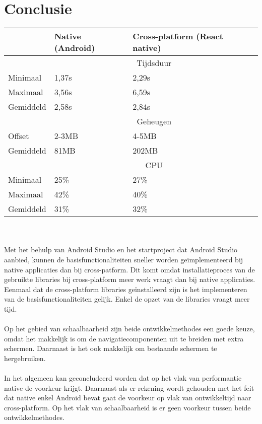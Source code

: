 \section{Conclusie}
\begin{tabular}{ |p{3cm}||p{6cm}|p{6cm}| }
    \hline
     & Native (Android) & Cross-platform (React native) \\
    \hline
     & \multicolumn{2}{|c|}{Tijdsduur} \\
    \hline
    Minimaal & 1,37s & 2,29s \\
    Maximaal & 3,56s & 6,59s \\
    Gemiddeld & 2,58s & 2,84s \\
    \hline
     & \multicolumn{2}{|c|}{Geheugen} \\ 
    \hline
    Offset & 2-3MB & 4-5MB \\
    Gemiddeld & 81MB & 202MB \\
    \hline
     & \multicolumn{2}{|c|}{CPU} \\
    \hline
    Minimaal & 25\% & 27\% \\
    Maximaal & 42\% & 40\% \\
    Gemiddeld & 31\% & 32\% \\
    \hline
\end{tabular}
\\\\
Met het behulp van Android Studio en het startproject dat Android Studio aanbied, 
kunnen de basisfunctionaliteiten sneller worden geïmplementeerd bij 
native applicaties dan bij cross-patform. Dit komt omdat installatieproces van 
de gebruikte libraries bij cross-platform meer werk vraagt dan bij native applicaties. 
Eenmaal dat de cross-platform libraries geïnstalleerd zijn is het implementeren van de 
basisfunctionaliteiten gelijk. Enkel de opzet van de libraries vraagt meer tijd.
\\\\
Op het gebied van schaalbaarheid zijn beide ontwikkelmethodes een goede keuze, 
omdat het makkelijk is om de navigatiecomponenten uit te breiden met extra schermen. 
Daarnaast is het ook makkelijk om bestaande schermen te hergebruiken.
\\\\
In het algemeen kan geconcludeerd worden dat op het vlak van performantie native de 
voorkeur krijgt. Daarnaast als er rekening wordt gehouden met het feit dat 
native enkel Android bevat gaat de voorkeur op vlak van ontwikkeltijd naar cross-platform.
Op het vlak van schaalbaarheid is er geen voorkeur tussen beide ontwikkelmethodes.




















